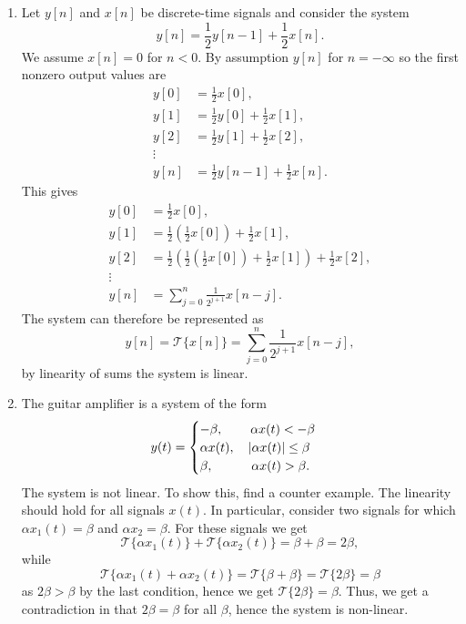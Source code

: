 \begin{enumerate}
\item Let $y[n]$ and $x[n]$ be discrete-time signals and consider the system 
$$y[n]=\frac{1}{2}y[n-1]+\frac{1}{2}x[n].$$
We assume $x[n]=0$ for $n<0$. By assumption $y[n]$ for $n=-\infty$ so the first nonzero output values are 
\begin{align*}
    y[0]&=\frac{1}{2}x[0], \\
    y[1]&=\frac{1}{2}y[0]+\frac{1}{2}x[1], \\
    y[2]&=\frac{1}{2}y[1]+\frac{1}{2}x[2], \\
    \vdots \\
    y[n]&=\frac{1}{2}y[n-1]+\frac{1}{2}x[n].
\end{align*}
This gives
\begin{align*}
    y[0]&=\frac{1}{2}x[0], \\
    y[1]&=\frac{1}{2}\left(\frac{1}{2}x[0]\right)+\frac{1}{2}x[1], \\
    y[2]&=\frac{1}{2}\left(\frac{1}{2}\left(\frac{1}{2}x[0]\right)+\frac{1}{2}x[1]\right)+\frac{1}{2}x[2], \\
    \vdots \\
    y[n]&=\sum_{j=0}^{n}\frac{1}{2^{j+1}}x[n-j].
\end{align*}
The system can therefore be represented as
$$y[n]=\mathcal{T}\{x[n]\}=\sum_{j=0}^{n}\frac{1}{2^{j+1}}x[n-j],$$
by linearity of sums the system is linear. 

\item The guitar amplifier is a system of the form
$$y(t)=\begin{cases}
    -\beta, \quad \hspace{0.4cm} \alpha x(t)<-\beta  \\
    \alpha x(t), \quad |\alpha x(t)|\le \beta \\
    \beta, \quad \hspace{0.7cm}\alpha x(t)>\beta.
\end{cases}$$
The system is not linear. To show this, find a counter example. The linearity should hold for all signals $x(t)$. In particular, consider two signals for which $\alpha x_{1}(t)=\beta$ and $\alpha x_{2}=\beta$. For these signals we get
$$\mathcal{T}\{\alpha x_{1}(t)\}+\mathcal{T}\{\alpha x_{2}(t)\}=\beta+\beta=2\beta,$$
while
$$\mathcal{T}\{\alpha x_{1}(t)+\alpha x_{2}(t)\}=\mathcal{T}\{\beta+\beta\}=\mathcal{T}\{2\beta\}=\beta$$
as $2\beta > \beta$ by the last condition, hence we get $\mathcal{T}\{2\beta\}=\beta$. Thus, we get a contradiction in that $2\beta=\beta$ for all $\beta$, hence the system is non-linear. 


\end{enumerate}
